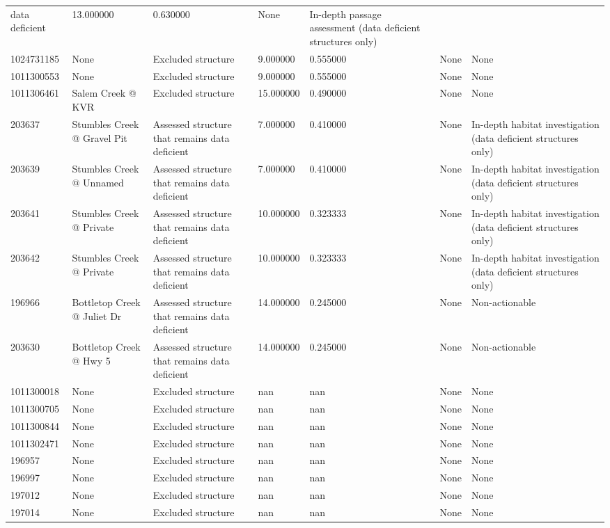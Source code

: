 \documentclass[
  letterpaper,
  DIV=11,
  numbers=noendperiod]{scrreprt}
\begin{document}
\begin{longtable}[]{@{}lllllll@{}}
data deficient & 13.000000 & 0.630000 & None & In-depth passage
assessment (data deficient structures only) \\
1024731185 & None & Excluded structure & 9.000000 & 0.555000 & None &
None \\
1011300553 & None & Excluded structure & 9.000000 & 0.555000 & None &
None \\
1011306461 & Salem Creek @ KVR & Excluded structure & 15.000000 &
0.490000 & None & None \\
203637 & Stumbles Creek @ Gravel Pit & Assessed structure that remains
data deficient & 7.000000 & 0.410000 & None & In-depth habitat
investigation (data deficient structures only) \\
203639 & Stumbles Creek @ Unnamed & Assessed structure that remains data
deficient & 7.000000 & 0.410000 & None & In-depth habitat investigation
(data deficient structures only) \\
203641 & Stumbles Creek @ Private & Assessed structure that remains data
deficient & 10.000000 & 0.323333 & None & In-depth habitat investigation
(data deficient structures only) \\
203642 & Stumbles Creek @ Private & Assessed structure that remains data
deficient & 10.000000 & 0.323333 & None & In-depth habitat investigation
(data deficient structures only) \\
196966 & Bottletop Creek @ Juliet Dr & Assessed structure that remains
data deficient & 14.000000 & 0.245000 & None & Non-actionable \\
203630 & Bottletop Creek @ Hwy 5 & Assessed structure that remains data
deficient & 14.000000 & 0.245000 & None & Non-actionable \\
1011300018 & None & Excluded structure & nan & nan & None & None \\
1011300705 & None & Excluded structure & nan & nan & None & None \\
1011300844 & None & Excluded structure & nan & nan & None & None \\
1011302471 & None & Excluded structure & nan & nan & None & None \\
196957 & None & Excluded structure & nan & nan & None & None \\
196997 & None & Excluded structure & nan & nan & None & None \\
197012 & None & Excluded structure & nan & nan & None & None \\
197014 & None & Excluded structure & nan & nan & None & None \\

\end{longtable}
\end{document}

